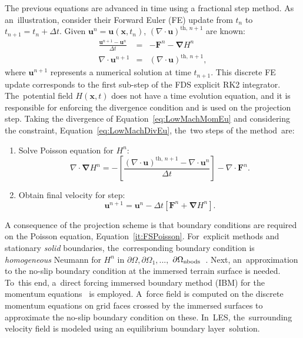 \documentclass[atmosphere,article,accept,moreauthors,pdftex]{Definitions/mdpi}
\begin{document}
\begin{paracol}{2}
The previous equations are advanced in time using a fractional step method. As an~illustration, consider their Forward Euler (FE) update from $t_n$ to $t_{n+1}=t_n + \Delta t$. Given $ \mathbf{u}^n=\mathbf{u}(\mathbf{x},t_n)$, $\left( \nabla \cdot \mathbf{u} \right)^{\mathrm{th},\,n+1}$ are known:
\begin{eqnarray}
  \frac{\mathbf{u}^{n+1}-\mathbf{u}^{n}}{\Delta t} &=& - \mathbf{F}^n -  \boldsymbol{\nabla} H^n \label{eq:LowMachMomEu}\\
  \nabla \cdot \mathbf{u}^{n+1} &=& \left( \nabla \cdot \mathbf{u} \right)^{\mathrm{th},\,n+1} \label{eq:LowMachDivEu},
\end{eqnarray}
where $\mathbf{u}^{n+1}$ represents a numerical solution at time $t_{n+1}$. This discrete FE update corresponds to the first sub-step of the FDS explicit RK2 integrator. The~potential field $H(\mathbf{x},t)$ does not have a time evolution equation, and it is responsible for enforcing the divergence condition and is used on the projection step. Taking the divergence of Equation~\eqref{eq:LowMachMomEu} and considering  the constraint, Equation~\eqref{eq:LowMachDivEu}, the~two steps of the method~are:
\begin{enumerate}
  \item Solve Poisson equation for $H^n$:
\begin{equation}
   \nabla \cdot \boldsymbol{\nabla} H^n = - \left[ \frac{\left( \nabla \cdot \mathbf{u} \right)^{\mathrm{th},\,n+1} - \nabla \cdot \mathbf{u}^{n}}{\Delta t} \right] - \nabla \cdot \mathbf{F}^n. \label{it:FSPoisson}
\end{equation}

  \item Obtain final velocity for step:
\begin{equation}
     \mathbf{u}^{n+1} = \mathbf{u}^{n} - \Delta t \left[ \mathbf{F}^n +  \boldsymbol{\nabla} H^n \right] \label{it:FSProject}.
   \end{equation}

\end{enumerate}

A consequence of the projection scheme is that boundary conditions are required on the Poisson equation, Equation~\eqref{it:FSPoisson}. For~explicit methods and stationary \textit{solid} boundaries, the~corresponding boundary condition is \textit{homogeneous} Neumann for $H^n$ in $\partial \Omega,\partial \Omega_1,...,$ $\partial \Omega_{\rm nbods}$~\cite{perot_1993}.
Next, an~approximation to the no-slip boundary condition at the immersed terrain surface is needed. To~this end, a~direct forcing immersed boundary method (IBM) for the momentum equations~\cite{fadlun_2000} is employed. A~force field is computed on the discrete momentum equations on grid faces crossed by the immersed surfaces to approximate the no-slip boundary condition on these. In~LES, the~surrounding velocity field is modeled using an equilibrium boundary layer~solution.


\end{paracol}
\end{document}
